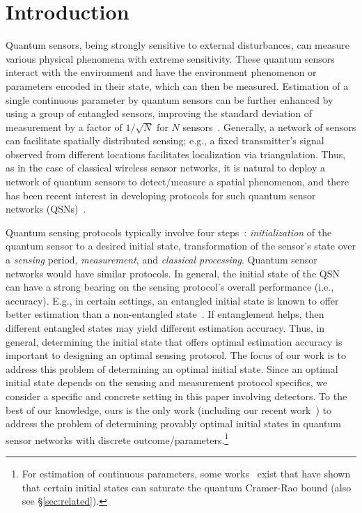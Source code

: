 \section{Introduction}


Quantum sensors, being strongly sensitive to external disturbances, can measure various physical phenomena with extreme sensitivity. 
These quantum sensors interact with the environment 
and have the environment phenomenon or parameters encoded in their state, which can then be 
measured. Estimation of a single continuous parameter by quantum sensors can be further enhanced by using a group of entangled sensors, improving the standard deviation of measurement by a factor of $1/\sqrt{N}$ for $N$ sensors~\cite{Giovannetti_2011}. 
Generally, a network of sensors can facilitate spatially distributed sensing; e.g., a fixed transmitter's signal observed from different locations facilitates localization via triangulation. 
Thus, as in the case of classical wireless sensor networks, it is natural to deploy a network of quantum sensors to detect/measure a spatial phenomenon, and there has been recent interest in developing protocols for such quantum sensor networks (QSNs)~\cite{PhysRevResearch.qsn, PhysRevA.qsn, mpe_2018, Eldredge_2018}.

Quantum sensing protocols typically involve four steps~\cite{RevModPhys.quantumsensing}: {\em initialization} of the quantum sensor to a desired initial state, transformation of the sensor's state over a {\em sensing} period, {\em measurement}, and {\em classical processing}.
Quantum sensor networks would have similar protocols.
In general, the initial state of the QSN can have a strong bearing on the
sensing protocol's overall performance (i.e., accuracy). E.g., in certain
settings, an entangled initial state is known to offer better estimation than
a non-entangled state~\cite{mpe_2018,Eldredge_2018}. 
If entanglement helps, then different 
entangled states may yield different estimation accuracy.
Thus, in general, determining the initial state that offers optimal estimation 
accuracy is important to designing an optimal sensing protocol.
The focus of our work is to address this problem of determining an optimal initial 
state. Since an optimal initial state depends on the sensing and 
measurement protocol specifics, we consider a specific and concrete 
setting in this paper involving detectors.  
To the best of our knowledge, 
ours is the only work (including our recent work~\cite{PhysRevA.qsn}) to 
address the problem of determining provably optimal initial states in quantum sensor 
networks with discrete outcome/parameters.\footnote{For estimation of continuous parameters, 
some works~\cite{Eldredge_2018,saleem_dickestate} exist that have shown that 
certain initial states can saturate the quantum Cramer-Rao bound 
(also see \S\ref{sec:related}).}


